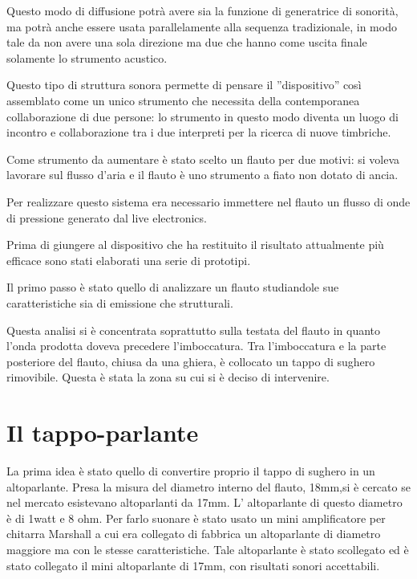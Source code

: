 Questo modo di diffusione potrà avere sia la funzione di generatrice di
sonorità, ma potrà anche essere usata parallelamente alla sequenza tradizionale,
in modo tale da non avere una sola direzione ma due che hanno come uscita
finale solamente lo strumento acustico.

Questo tipo di struttura sonora  permette di pensare il ”dispositivo” così
assemblato come   un unico strumento  che necessita della contemporanea
collaborazione di due persone: lo strumento in questo modo diventa un luogo di
incontro e collaborazione tra i due interpreti per la ricerca di nuove timbriche.

Come strumento da aumentare è stato scelto un flauto per due motivi: si voleva
lavorare sul flusso d’aria e il flauto è uno strumento a fiato non dotato di ancia.

Per realizzare questo  sistema era necessario immettere nel flauto un flusso di
onde di pressione generato dal live electronics.

Prima di giungere al dispositivo che ha restituito il risultato attualmente più
efficace sono stati elaborati una serie di prototipi.

Il primo passo è stato quello di analizzare un flauto studiandole sue
caratteristiche sia di emissione che strutturali.

Questa analisi si è concentrata soprattutto sulla testata del flauto in quanto l’onda prodotta doveva precedere l’imboccatura.
Tra l’imboccatura e la parte posteriore del flauto, chiusa da una ghiera, è collocato un tappo di sughero rimovibile. Questa è stata la zona su cui si è deciso di intervenire.

\section{Il tappo-parlante}

La prima idea è stato quello di convertire proprio il tappo di sughero in un altoparlante. Presa la misura del diametro interno del flauto, 18mm,si è cercato se nel mercato esistevano altoparlanti da 17mm. L’ altoparlante di questo diametro è di 1watt e 8 ohm. Per farlo suonare è stato usato un mini amplificatore per chitarra Marshall a cui era collegato di fabbrica  un altoparlante di diametro maggiore ma con le stesse caratteristiche. Tale altoparlante è stato scollegato ed è stato collegato il mini altoparlante di 17mm, con risultati sonori accettabili.


